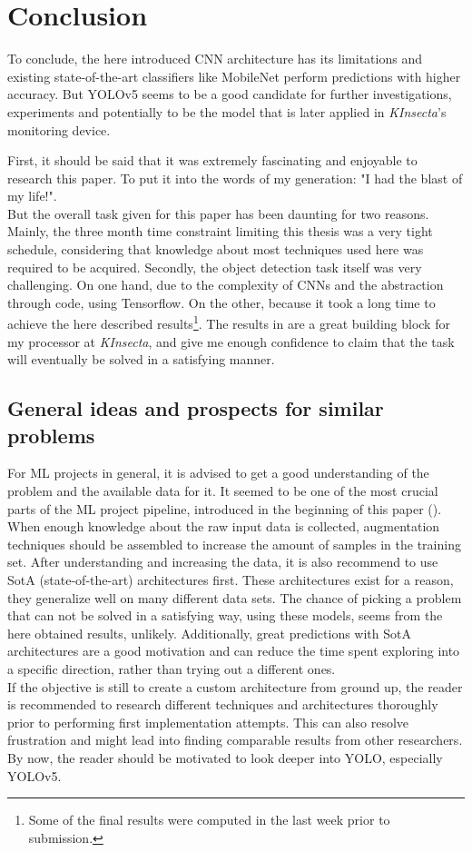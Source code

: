 \section{Conclusion}\label{sec:conclusion}
To conclude, the here introduced CNN architecture has its limitations and existing state-of-the-art classifiers like MobileNet perform predictions with higher accuracy.
But YOLOv5 seems to be a good candidate for further investigations, experiments and potentially to be the model that is later applied in \textit{KInsecta}'s monitoring device.

First, it should be said that it was extremely fascinating and enjoyable to research this paper.
To put it into the words of my generation: "I had the blast of my life!".\\
But the overall task given for this paper has been daunting for two reasons.
Mainly, the three month time constraint limiting this thesis was a very tight schedule, considering that knowledge about most techniques used here was required to be acquired.
Secondly, the object detection task itself was very challenging.
On one hand, due to the complexity of CNNs and the abstraction through code, using Tensorflow.
On the other, because it took a long time to achieve the here described results\footnote{Some of the final results were computed in the last week prior to submission.}.
The results in  are a great building block for my processor at \textit{KInsecta}, and give me enough confidence to claim that the task will eventually be solved in a satisfying manner.

\subsection{General ideas and prospects for similar problems}\label{subsec:prospects}
For ML projects in general, it is advised to get a good understanding of the problem and the available data for it.
It seemed to be one of the most crucial parts of the ML project pipeline, introduced in the beginning of this paper ().
When enough knowledge about the raw input data is collected, augmentation techniques should be assembled to increase the amount of samples in the training set.
After understanding and increasing the data, it is also recommend to use SotA (state-of-the-art) architectures first.
These architectures exist for a reason, they generalize well on many different data sets.
The chance of picking a problem that can not be solved in a satisfying way, using these models, seems from the here obtained results, unlikely.
Additionally, great predictions with SotA architectures are a good motivation and can reduce the time spent exploring into a specific direction, rather than trying out a different ones.\\
If the objective is still to create a custom architecture from ground up, the reader is recommended to research different techniques and architectures thoroughly prior to performing first implementation attempts.
This can also resolve frustration and might lead into finding comparable results from other researchers.\\
By now, the reader should be motivated to look deeper into YOLO, especially YOLOv5.
